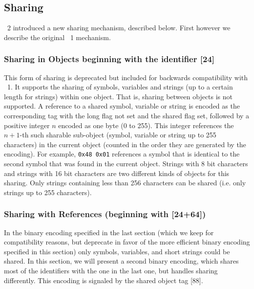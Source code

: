 \subsection{Sharing}\label{sec_both_sharing}
  
  
\OM~2 introduced a new sharing mechanism, described below.  First however we describe the
original \OM~1 mechanism.
  
\subsubsection{Sharing in Objects beginning with the identifier [24]}\label{sec_sharing}
    
This form of sharing is deprecated but included for backwards compatibility with \OM~1.
It supports the sharing of symbols, variables and strings (up to a certain length for
strings) within one object. That is, sharing between objects is not supported.  A
reference to a shared symbol, variable or string is encoded as the corresponding tag with
the long flag not set and the shared flag set, followed by a positive integer $n$ encoded
as one byte (0 to 255). This integer references the $n+1$-th such sharable sub-object
(symbol, variable or string up to 255 characters) in the current \OM object (counted in
the order they are generated by the encoding).  For example, \lstinline|0x48 0x01|
references a symbol that is identical to the second symbol that was found in the current
object.  Strings with 8 bit characters and strings with 16 bit characters are two
different kinds of objects for this sharing. Only strings containing less than 256
characters can be shared (i.e. only strings up to 255 characters).

  
  
  \subsubsection{Sharing with References (beginning with [24+64])}\label{sec_sharing_references}
    
  In the binary encoding specified in the last section (which we keep for compatibility
  reasons, but deprecate in favor of the more efficient binary encoding specified in this
  section) only symbols, variables, and short strings could be shared. In this section, we
  will present a second binary encoding, which shares most of the identifiers with the one
  in the last one, but handles sharing differently. This encoding is signaled by the
  shared object tag [88].

